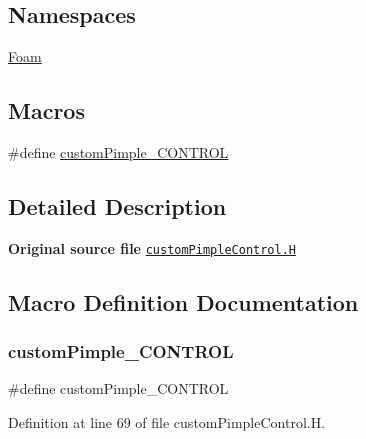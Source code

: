\subsection*{Namespaces}
\begin{DoxyCompactItemize}
\item 
 \hyperlink{namespaceFoam}{Foam}
\end{DoxyCompactItemize}
\subsection*{Macros}
\begin{DoxyCompactItemize}
\item 
\#define \hyperlink{customPimpleControl_8H_a52239628f1ec6b32bb02938913b8f038}{custom\+Pimple\+\_\+\+C\+O\+N\+T\+R\+OL}
\end{DoxyCompactItemize}


\subsection{Detailed Description}
{\bfseries Original source file} \href{../../../home/carlo/data/GeN-Foam/GeN-Foam_ffn/GeN-Foam/GeN-Foam/classes/thermalHydraulics/src/customPimpleControl/customPimpleControl.H}{\tt custom\+Pimple\+Control.\+H} 

\subsection{Macro Definition Documentation}
\mbox{\label{customPimpleControl_8H_a52239628f1ec6b32bb02938913b8f038}} 
\subsubsection{\texorpdfstring{custom\+Pimple\+\_\+\+C\+O\+N\+T\+R\+OL}{customPimple\_CONTROL}}
{\footnotesize\ttfamily \#define custom\+Pimple\+\_\+\+C\+O\+N\+T\+R\+OL}



Definition at line 69 of file custom\+Pimple\+Control.\+H.

